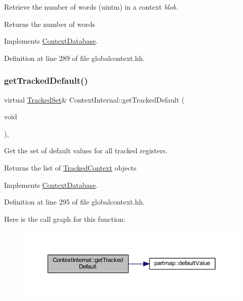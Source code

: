 Retrieve the number of words (uintm) in a context {\itshape blob}. 

\begin{DoxyReturn}{Returns}
the number of words 
\end{DoxyReturn}


Implements \mbox{\hyperlink{class_context_database_add56654146d3e6d9bab727980fd1da28}{Context\+Database}}.



Definition at line 289 of file globalcontext.\+hh.

\mbox{\label{class_context_internal_a38f6d0158f108dd29132250b1cb234b1}} 
\subsubsection{\texorpdfstring{getTrackedDefault()}{getTrackedDefault()}}
{\footnotesize\ttfamily virtual \mbox{\hyperlink{globalcontext_8hh_a7559d2c55c5d12fbbaf0418733b62438}{Tracked\+Set}}\& Context\+Internal\+::get\+Tracked\+Default (\begin{DoxyParamCaption}\item[{void}]{ }\end{DoxyParamCaption})\hspace{0.3cm}{\ttfamily [inline]}, {\ttfamily [virtual]}}



Get the set of default values for all tracked registers. 

\begin{DoxyReturn}{Returns}
the list of \mbox{\hyperlink{struct_tracked_context}{Tracked\+Context}} objects 
\end{DoxyReturn}


Implements \mbox{\hyperlink{class_context_database_a08908cbaeb6c0a722e40f9392d9615bd}{Context\+Database}}.



Definition at line 295 of file globalcontext.\+hh.

Here is the call graph for this function\+:
\nopagebreak
\begin{figure}[H]
\begin{center}
\leavevmode
\includegraphics[width=350pt]{class_context_internal_a38f6d0158f108dd29132250b1cb234b1_cgraph}
\end{center}
\end{figure}
\mbox{\label{class_context_internal_a0953f0bba2a187d4cd001463c9f667ab}} 
